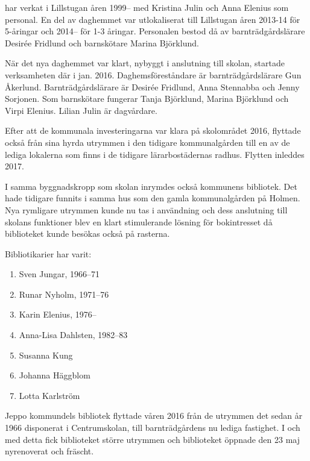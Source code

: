  har verkat i Lillstugan åren 1999-- med Kristina Julin och Anna Elenius som personal. En del av daghemmet var utlokaliserat till Lillstugan åren 2013-14 för 5-åringar och 2014-- för 1-3 åringar. Personalen bestod då av barnträdgårdslärare Desirée Fridlund och barnskötare Marina Björklund.

När det nya daghemmet var klart, nybyggt i anslutning till skolan, startade verksamheten där i jan. 2016. Daghemsföreståndare är barnträdgårdslärare Gun Åkerlund. Barnträdgårdslärare är Desirée Fridlund, Anna Stennabba och Jenny Sorjonen. Som barnskötare fungerar Tanja Björklund, Marina Björklund och Virpi Elenius. Lilian Julin är dagvårdare.

Efter att de kommunala investeringarna var klara på skolområdet 2016, flyttade också  från sina hyrda utrymmen i den tidigare kommunalgården till en av de lediga lokalerna som finns i de tidigare lärarbostädernas radhus. Flytten inleddes 2017.


I samma byggnadskropp som skolan inrymdes också kommunens bibliotek. Det hade tidigare funnits i samma hus som den gamla kommunalgården på Holmen. Nya rymligare utrymmen kunde nu tas i användning och dess anslutning till skolans funktioner blev en klart stimulerande lösning för bokintresset då biblioteket kunde besökas också på rasterna.

Bibliotikarier har varit:
\begin{enumerate}
  \item Sven Jungar, 1966--71
  \item Runar Nyholm, 1971--76
  \item Karin Elenius, 1976--
  \item Anna-Lisa Dahlsten, 1982--83
  \item Susanna Kung
  \item Johanna Häggblom
  \item Lotta Karlström
\end{enumerate}



%


%
Jeppo kommundels bibliotek flyttade våren 2016 från de utrymmen det sedan år 1966 disponerat i Centrumskolan, till barnträdgårdens nu lediga fastighet. I och med detta fick biblioteket större utrymmen och biblioteket öppnade den 23 maj nyrenoverat och fräscht.


